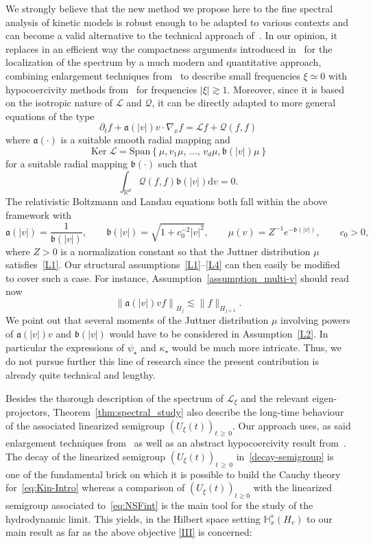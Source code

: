 \documentclass[10pt]{amsart}
\theoremstyle{definition}\newtheorem{defi}[theo]{Definition}\newtheorem{rema}[theo]{Remark}\newtheorem{exam}[theo]{Example}\newtheorem{exem}[theo]{Example}\newtheorem{nota}[theo]{Notation}
\DeclareMathOperator{\nul}{Ker}
\renewcommand{\d}{\mathrm{d}}
\newcommand{\rSpan}{\mathrm{Span}}
\newcommand{\R}{\mathbb{R}}
\newcommand{\bbH}{\mathbb{H}}
\newcommand{\fka}{\mathfrak{a}}
\newcommand{\fkb}{\mathfrak{b}}
\newcommand{\LL}{\mathcal{L}}
\newcommand{\QQ}{\mathcal{Q}}
\newcommand{\Ss}{H}
\renewcommand*\ge{\geqslant}
\renewcommand*\geq{\geqslant}
\begin{document}
We strongly believe that the new method we propose here to the fine spectral analysis of kinetic models is robust enough to be adapted to various contexts and can become a valid alternative to the technical approach of~\cite{EP1975}. In our opinion, it replaces in an efficient way the compactness arguments introduced in~\cite{EP1975} for the localization of the spectrum by a much modern and quantitative approach, combining enlargement techniques from~\cite{GMM2017} to describe small frequencies $\xi\simeq 0$ with hypocoercivity methods from~\cite{D2011} for frequencies $|\xi| \gtrsim 1.$ Moreover, since it is based on the isotropic nature of $\LL$ and $\QQ$, it can be directly adapted to more general equations of the type
\[
\partial_t f+ \fka(|v|) v \cdot \nabla_x f=\LL f+ \QQ(f,f)
\]
where $\fka(\cdot)$ is a suitable smooth radial mapping and
\[
\nul \LL=\rSpan\left\{\mu,v_1\mu,\,\ldots,\,v_d\mu,\fkb(|v|)\mu\right\}
\]
for a suitable radial mapping $\fkb(\cdot)$ such that
\[
\int_{\R^d}\QQ(f,f)\fkb(|v|)\d v=0.
\]
The relativistic Boltzmann and Landau equations both fall within the above framework with
\[
\fka(|v|)=\frac{1}{\fkb(|v|)}, \qquad \fkb(|v|)=\sqrt{1+c_0^{-2}|v|^2}, \qquad \mu(v)=Z^{-1}e^{-\fkb(|v|)}, \qquad c_0 > 0,
\]
where $Z >0$ is a normalization constant so that the Juttner distribution $\mu$ satisfies~\eqref{L1}. Our structural assumptions~\eqref{L1}--\eqref{L4} can then easily be modified to cover such a case. For instance, Assumption~\ref{assumption_multi-v} should read now
\[
\left\|\fka(|v|)vf\right\|_{\Ss_j} \lesssim \|f\|_{\Ss_{j+1}}.
\]
We point out that several moments of the Juttner distribution $\mu$ involving powers of $\fka(|v|)v$ and $\fkb(|v|)$ would have to be considered in Assumption~\eqref{L2}. In particular the expressions of $\psi_\star$ and $\kappa_\star$ would be much more intricate. Thus, we do not pursue further this line of research since the present contribution is already quite technical and lengthy.
\bigskip

Besides the thorough description of the spectrum of $\LL_\xi$ and the relevant eigen-projectors, Theorem~\ref{thm:spectral_study} also describe the long-time behaviour of the associated linearized semigroup $\left(U_\xi(t)\right)_{t\,\ge\,0}$. Our approach uses, as said enlargement techniques from~\cite{GMM2017} as well as an abstract hypocoercivity result from~\cite{D2011}. The decay of the linearized semigroup $\left(U_{\xi}(t)\right)_{t\,\geq\,0}$ in~\eqref{decay-semigroup} is one of the fundamental brick on which it is possible to build the Cauchy theory for~\eqref{eq:Kin-Intro} whereas a comparison of $(U_\xi(t))_{t \geq0}$ with the linearized semigroup associated to~\eqref{eq:NSFint} is the main tool for the study of the hydrodynamic limit. This yields, in the Hilbert space setting $\bbH^s_x(\Ss_v)$ to our main result as far as the above objective \eqref{III} is concerned:
\end{document}
